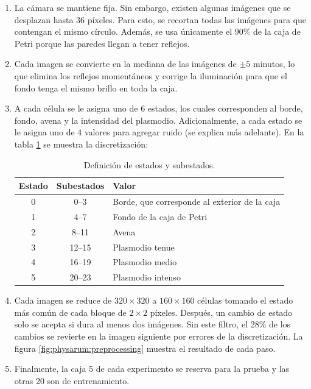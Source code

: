 \begin{enumerate}
	\item La cámara se mantiene fija. Sin embargo, existen algunas imágenes que se desplazan hasta 36 píxeles. Para esto, se recortan todas las imágenes para que contengan el mismo círculo. Además, se usa únicamente el $90\%$ de la caja de Petri porque las paredes llegan a tener reflejos. 
	
	\item Cada imagen se convierte en la mediana de las imágenes de $\pm 5$ minutos, lo que elimina los reflejos momentáneos y corrige la iluminación para que el fondo tenga el mismo brillo en toda la caja.

	\item A cada célula se le asigna uno de 6 estados, los cuales corresponden al borde, fondo, avena y la intensidad del plasmodio. Adicionalmente, a cada estado se le asigna uno de 4 valores para agregar ruido (se explica más adelante). En la tabla \ref{tab:physarum:states} se muestra la discretización:
	
	\begin{table}[H]
		\centering
		\begin{tabular}{c c l}
			\hline
			\textbf{Estado} & \textbf{Subestados} & \textbf{Valor} \\ \hline
			0 & 0--3 & Borde, que corresponde al exterior de la caja \\
			1 & 4--7 & Fondo de la caja de Petri \\
			2 & 8--11 & Avena \\
			3 & 12--15 & Plasmodio tenue \\
			4 & 16--19 & Plasmodio medio \\
			5 & 20--23 & Plasmodio intenso
		\end{tabular}
		\caption{Definición de estados y subestados.}
		\label{tab:physarum:states}
	\end{table}

	\item Cada imagen se reduce de $320 \times 320$ a $160 \times 160$ células tomando el estado más común de cada bloque de $2 \times 2$ píxeles. Después, un cambio de estado solo se acepta si dura al menos dos imágenes. Sin este filtro, el 28\% de los cambios se revierte en la imagen siguiente por errores de la discretización. La figura \ref{fig:physarum:preprocessing} muestra el resultado de cada paso.

	\item Finalmente, la caja 5 de cada experimento se reserva para la prueba y las otras 20 son de entrenamiento.
\end{enumerate}

